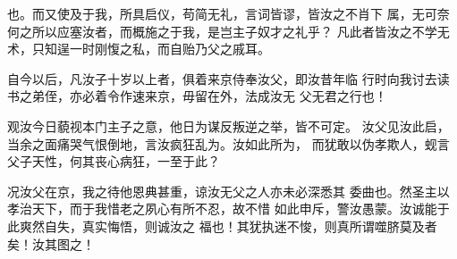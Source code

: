 {\bookkai 也。而又使及于我，所具启仪，苟简无礼，言词皆谬，皆汝之不肖下}%
{\bookkai 属，无可奈何之所以应塞汝者，而概施之于我，是岂主子奴才之礼乎？}%
{\bookkai 凡此者皆汝之不学无术，只知逞一时刚愎之私，而自贻乃父之戚耳。}%
\par
{\bookkai 自今以后，凡汝子十岁以上者，俱着来京侍奉汝父，即汝昔年临}%
{\bookkai 行时向我讨去读书之弟侄，亦必着令作速来京，毋留在外，法成汝无}%
{\bookkai 父无君之行也！}%
\par
{\bookkai 观汝今日藐视本门主子之意，他日为谋反叛逆之举，皆不可定。}%
{\bookkai 汝父见汝此启，当余之面痛哭气恨倒地，言汝疯狂乱为。汝如此所为，}%
{\bookkai 而犹敢以伪孝欺人，蚬言父子天性，何其丧心病狂，一至于此？}%
\par
{\bookkai 况汝父在京，我之待他恩典甚重，谅汝无父之人亦未必深悉其}%
{\bookkai 委曲也。然圣主以孝治天下，而于我惜老之夙心有所不忍，故不惜}%
{\bookkai 如此申斥，警汝愚蒙。汝诚能于此爽然自失，真实悔悟，则诚汝之}%
{\bookkai 福也！其犹执迷不悛，则真所谓噬脐莫及者矣！汝其图之！}%
